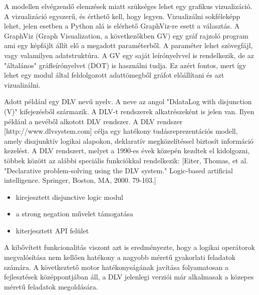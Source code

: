 
A modellen elvégzendő elemzések miatt szükséges lehet egy grafikus vizualizáció. A vizualizáció egyszerű, és érthető kell, hogy legyen. Vizualizálni sokféleképp lehet, jelen esetben a Python alá is elérhető GraphViz-re esett a választás. A GraphViz (Graph Visualization, a következőkben GV) egy gráf rajzoló program ami egy képfájlt állít elő a megadott paraméterből. A paraméter lehet szövegfájl, vagy valamilyen adatstruktúra. A GV egy saját leírónyelvvel is rendelkezik, de az "általános" gráfleírónyelvet (DOT) is használni tudja. Ez azért fontos, mert így lehet egy modul által feldolgozott adattömegből gráfot előállítani és azt vizualizálni.

Adott például egy DLV nevű nyelv. A neve az angol "DdataLog with disjunction (V)" kifejezésből származik. A DLV-t rendszerek alkatrészeként is jelen van. Ilyen például a nevéből alkotott DLV rendszer. A DLV rendszer [http://www.dlvsystem.com]  célja egy hatékony tudásreprezentációs modell, amely diszjunktív logikai alapokon, deklaratív megközelítéssel  biztosít  információ kezelést. A DLV rendszert, melyet a 1990-es évek közepén kezdtek el kidolgozni,  többek között az alábbi speciális funkciókkal rendelkezik: [Eiter, Thomas, et al. "Declarative problem-solving using the DLV system." Logic-based artificial intelligence. Springer, Boston, MA, 2000. 79-103.] 
\begin{itemize}
\item kirejesztett  disjunctive logic modul
\item a  strong negation művelet támogatása
\item kiterjesztett API felület 
\end{itemize}
A kibővített funkcionalitás viszont azt is eredményezte, hogy a logikai operátorok megvalósítása nem kellően hatékony a nagyobb méretű gyakorlati feladatok számára. A következtető motor hatékonyságának javítása folyamatosan a fejlesztések középpontjában áll, a DLV jelenlegi verziói már alkalmasak a közepes méretű feladatok megoldására.


